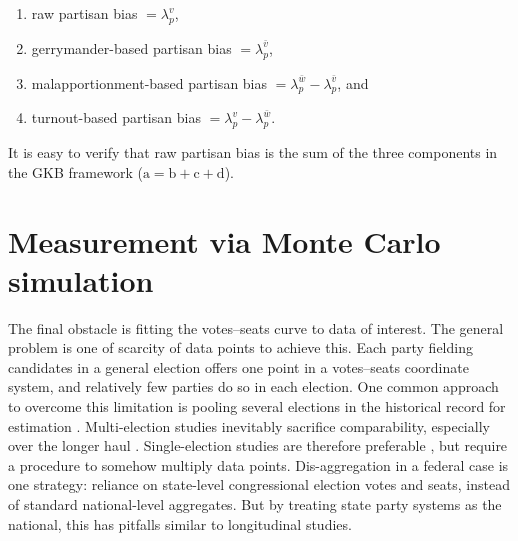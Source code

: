\documentclass[letter,12pt]{article}
\begin{document}
\begin{enumerate}
\renewcommand{\theenumi}{\alph{enumi}}
\item raw partisan bias $=\lambda_p^v$,
\item gerrymander-based partisan bias $=\lambda_p^{\bar{v}}$, 
\item malapportionment-based partisan bias $=\lambda_p^{\bar{w}}-\lambda_p^{\bar{v}}$, and
\item turnout-based partisan bias $=\lambda_p^v-\lambda_p^{\bar{w}}$.
\end{enumerate}

\noindent It is easy to verify that raw partisan bias is the sum of the three components in the GKB framework ($\text{a}=\text{b}+\text{c}+\text{d}$). 

\section{Measurement via Monte Carlo simulation}

The final obstacle is fitting the votes--seats curve to data of interest. The general problem is one of scarcity of data points to achieve this. Each party fielding candidates in a general election offers one point in a votes--seats coordinate system, and relatively few parties do so in each election. One common approach to overcome this limitation is pooling several elections in the historical record for estimation \citep[e.g.,][]{marquez2014biasBlog}. Multi-election studies inevitably sacrifice comparability, especially over the longer haul \citep{jackmanMeasuringBias1994}. Single-election studies are therefore preferable \citep{niemi.fett1986swing}, but require a procedure to somehow multiply data points. Dis-aggregation in a federal case is one strategy: reliance on state-level congressional election votes and seats, instead of standard national-level aggregates. But by treating state party systems as the national, this has pitfalls similar to longitudinal studies.
\end{document}
